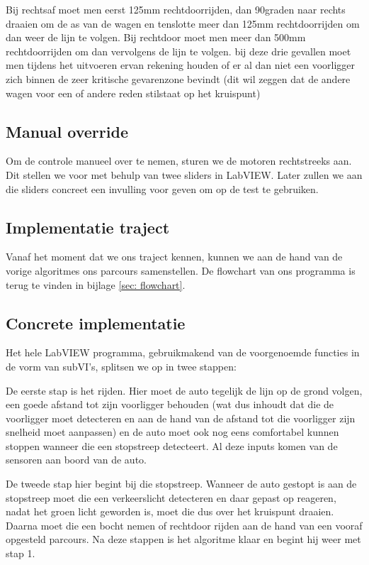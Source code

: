 \documentclass[a4paper,twoside,kulak]{kulakreport}
\begin{document}
	Bij rechtsaf moet men eerst 125mm rechtdoorrijden, dan 90graden naar rechts draaien om de as van de wagen en tenslotte meer dan 125mm rechtdoorrijden om dan weer de lijn te volgen. Bij rechtdoor moet men meer dan 500mm rechtdoorrijden om dan vervolgens de lijn te volgen. bij deze drie gevallen moet men tijdens het uitvoeren ervan rekening houden of er al dan niet een voorligger zich binnen de zeer kritische gevarenzone bevindt (dit wil zeggen dat de andere wagen voor een of andere reden stilstaat op het kruispunt)
	
	\subsection{Manual override}
		Om de controle manueel over te nemen, sturen we de motoren rechtstreeks aan. Dit stellen we voor met behulp van twee sliders in LabVIEW. Later zullen we aan die sliders concreet een invulling voor geven om op de test te gebruiken.
	
	\subsection{Implementatie traject}
	
	Vanaf het moment dat we ons traject kennen, kunnen we aan de hand van de vorige algoritmes ons parcours samenstellen. De flowchart van ons programma is terug te vinden in bijlage \ref{sec: flowchart}.
	
	\subsection{Concrete implementatie}
	Het hele LabVIEW programma, gebruikmakend van de voorgenoemde functies in de vorm van subVI's, splitsen we op in twee stappen:\bigskip
	
	De eerste stap is het rijden. Hier moet de auto tegelijk de lijn op de grond volgen, een goede afstand tot zijn voorligger behouden (wat dus inhoudt dat die de voorligger moet detecteren en aan de hand van de afstand tot die voorligger zijn snelheid moet aanpassen) en de auto moet ook nog eens comfortabel kunnen stoppen wanneer die een stopstreep detecteert. Al deze inputs komen van de sensoren aan boord van de auto.\bigskip
	
	De tweede stap hier begint bij die stopstreep. Wanneer de auto gestopt is aan de stopstreep moet die een verkeerslicht detecteren en daar gepast op reageren, nadat het groen licht geworden is, moet die dus over het kruispunt draaien. Daarna moet die een bocht nemen of rechtdoor rijden aan de hand van een vooraf opgesteld parcours. Na deze stappen is het algoritme klaar en begint hij weer met stap 1.\bigskip
	
\end{document}
